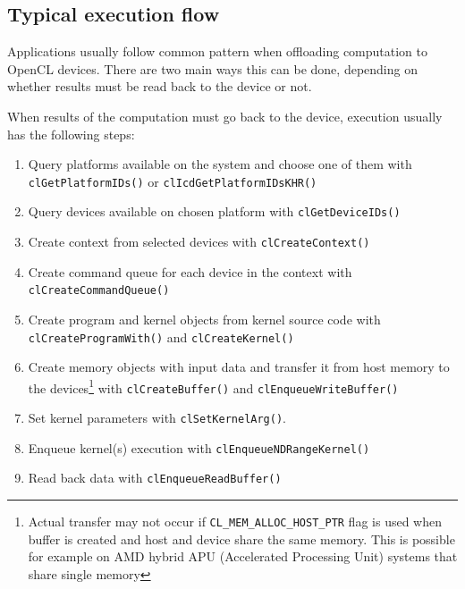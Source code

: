 \subsection{Typical execution flow}
Applications usually follow common pattern when offloading computation to OpenCL
devices. There are two main ways this can be done, depending on whether results
must be read back to the device or not.

When results of the computation must go back to the device, execution usually
has the following steps:

\begin{enumerate}
  \item Query platforms available on the system and choose one of them with
    \texttt{clGetPlatformIDs()} or \texttt{clIcd\-Get\-Platform\-IDsKHR()}
  \item Query devices available on chosen platform with \texttt{clGet\-DeviceIDs()}
  \item Create context from selected devices with \texttt{clCreate\-Context()}
  \item Create command queue for each device in the context with
    \texttt{clCreate\-Command\-Queue()}
  \item Create program and kernel objects from kernel source code with
    \texttt{clCreate\-Program\-With()} and
    \texttt{clCreate\-Kernel()}
  \item Create memory objects with input data and transfer it from host memory
    to the devices\footnote{Actual transfer may not occur if
      \texttt{CL\_MEM\_ALLOC\_HOST\_PTR} flag is used when buffer is created and
      host and device share the same memory. This is possible for example on
    AMD hybrid APU (Accelerated Processing Unit) systems that share single
    memory} with
    \texttt{clCreate\-Buffer()} and \texttt{clEnqueue\-Write\-Buffer()}
  \item Set kernel parameters with \texttt{clSet\-KernelArg()}.
  \item Enqueue kernel(s) execution with \texttt{clEnqueue\-NDRange\-Kernel()}
  \item Read back data with \texttt{clEnqueue\-Read\-Buffer()}
\end{enumerate}

